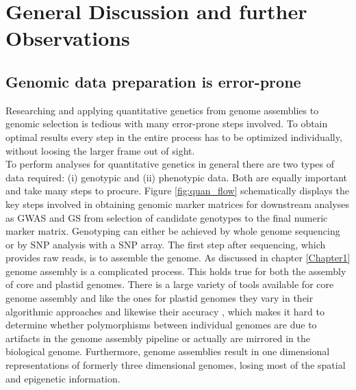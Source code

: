\chapter{General Discussion and further Observations} %
\label{Chapter6}
\section{Genomic data preparation is error-prone}

Researching and applying quantitative genetics from genome assemblies to genomic selection
is tedious with many error-prone steps involved. To obtain optimal results every step in
the entire process has to be optimized individually, without loosing the larger frame out
of sight. \\
To perform analyses for quantitative genetics in general there are two types of data
required: (i) genotypic and (ii) phenotypic data. Both are equally important and take many
steps to procure. Figure \ref{fig:quan_flow} schematically displays the key steps involved
in obtaining genomic marker matrices for downstream analyses as GWAS and GS from selection
of candidate genotypes to the final numeric marker matrix. Genotyping can either be
achieved by whole genome sequencing or by SNP analysis with a SNP array.  The first step
after sequencing, which provides raw reads, is to assemble the genome. As discussed in
chapter \ref{Chapter1} genome assembly is a complicated process. This holds true for both
the assembly of core and plastid genomes. There is a large variety of tools available for
core genome assembly and like the ones for plastid genomes they vary in their algorithmic
approaches and likewise their accuracy \cite{zhang2011practical}, which makes it hard to
determine whether polymorphisms between individual genomes are due to artifacts in the
genome assembly pipeline or actually are mirrored in the biological genome. Furthermore,
genome assemblies result in one dimensional representations of formerly three dimensional
genomes, losing most of the spatial and epigenetic information.

